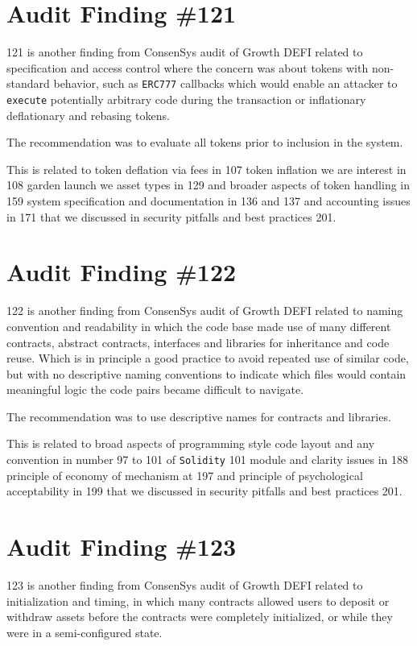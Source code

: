 \section{Audit Finding \#121}

121 is another finding from ConsenSys audit of Growth DEFI related to specification and access control where the concern was about tokens with non-standard behavior, such as \verb|ERC777| callbacks which would enable an attacker to \verb|execute| potentially arbitrary code during the transaction or inflationary deflationary and rebasing tokens.

The recommendation was to evaluate all tokens prior to inclusion in the system.

This is related to token deflation via fees in 107 token inflation we are interest in 108 garden launch we asset types in 129 and broader aspects of token handling in 159 system specification and documentation in 136 and 137 and accounting issues in 171 that we discussed in security pitfalls and best practices 201.

\section{Audit Finding \#122}

122 is another finding from ConsenSys audit of Growth DEFI related to naming convention and readability in which the code base made use of many different contracts, abstract contracts, interfaces and libraries for inheritance and code reuse. Which is in principle a good practice to avoid repeated use of similar code, but with no descriptive naming conventions to indicate which files would contain meaningful logic the code pairs became difficult to navigate.

The recommendation was to use descriptive names for contracts and libraries.

This is related to broad aspects of programming style code layout and any convention in number 97 to 101 of \verb|Solidity| 101 module and clarity issues in 188 principle of economy of mechanism at 197 and principle of psychological acceptability in 199 that we discussed in security pitfalls and best practices 201.

\section{Audit Finding \#123}

123 is another finding from ConsenSys audit of Growth DEFI related to initialization and timing, in which many contracts allowed users to deposit or withdraw assets before the contracts were completely initialized, or while they were in a semi-configured state. 

